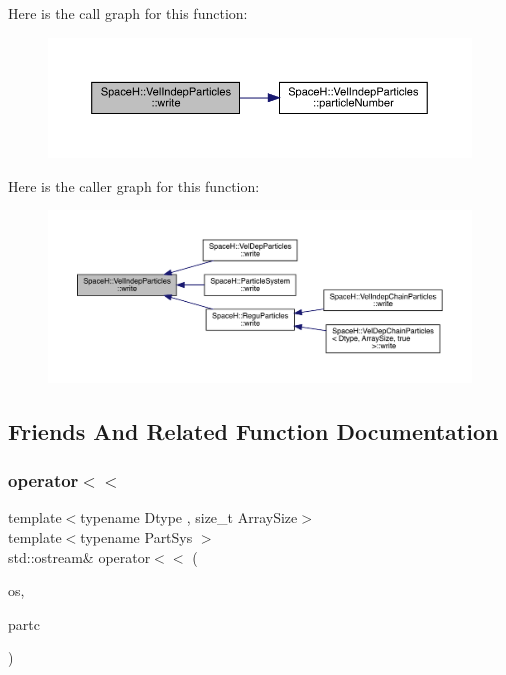 Here is the call graph for this function\+:
\nopagebreak
\begin{figure}[H]
\begin{center}
\leavevmode
\includegraphics[width=350pt]{class_space_h_1_1_vel_indep_particles_a29f0ab3b29eeabc746117ec2a759d8b1_cgraph}
\end{center}
\end{figure}
Here is the caller graph for this function\+:
\nopagebreak
\begin{figure}[H]
\begin{center}
\leavevmode
\includegraphics[width=350pt]{class_space_h_1_1_vel_indep_particles_a29f0ab3b29eeabc746117ec2a759d8b1_icgraph}
\end{center}
\end{figure}


\subsection{Friends And Related Function Documentation}
\mbox{\label{class_space_h_1_1_vel_indep_particles_affef8e2a20305e8ee1e8f44e5c246e97}} 
\subsubsection{\texorpdfstring{operator$<$$<$}{operator<<}}
{\footnotesize\ttfamily template$<$typename Dtype , size\+\_\+t Array\+Size$>$ \\
template$<$typename Part\+Sys $>$ \\
std\+::ostream\& operator$<$$<$ (\begin{DoxyParamCaption}\item[{std\+::ostream \&}]{os,  }\item[{const Part\+Sys \&}]{partc }\end{DoxyParamCaption})\hspace{0.3cm}{\ttfamily [friend]}}



